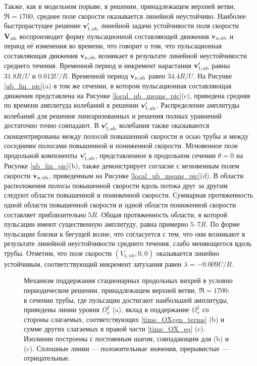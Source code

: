 Также, как в модельном порыве, в решении, принадлежащем верхней ветви, $\Re = 1700$, среднее поле скорости оказывается линейной неустойчиво. Наиболее быстрорастущее решение $\mathbf{v}'_\mathrm{1,ub}$ линейной задачи устойчивости поля скорости $\mathbf{V}_\mathrm{ub}$ воспроизводит форму пульсационной составляющей движения $\mathbf{v}_\mathrm{n,ub}$ и период её изменения во времени, что говорит о том, что пульсационная составляющая движения $\mathbf{v}_\mathrm{n,ub}$ возникает в результате линейной неустойчивости среднего течения. Временной период и инкремент нарастания $\mathbf{v}'_\mathrm{1,ub}$ равны $31.8R/U$ и $0.012U/R$. Временной период $\mathbf{v}_\mathrm{n,ub}$ равен $34.4R/U$. На Рисунке \ref{ub_lin_pic}(a) в том же сечении, в котором пульсационная составляющая движения представлена на Рисунке \ref{local_ub_means_pic}(c), приведена средняя по времени амплитуда колебаний в решении $\mathbf{v}'_\mathrm{1,ub}$. Распределение амплитуды колебаний для решения линеаризованных и решения полных уравнений достаточно точно совпадают. В $\mathbf{v}'_\mathrm{1,ub}$ колебания также оказываются сконцентрированы между полосой повышенной скорости и осью трубы и между соседними полосами повышенной и пониженной скорости. Мгновенное поле продольной компоненты $\mathbf{v}'_\mathrm{1,ub}$, представленное в продольном сечении $\theta = 0$ на Рисунке \ref{ub_lin_pic}(b), также демонстрирует согласие с мгновенным полем скорости $\mathbf{v}_\mathrm{n,ub}$, приведенным на Рисунке \ref{local_ub_means_pic}(d). В области расположения полосы повышенной скорости вдоль потока друг за другим следуют области повышенной и пониженной скорости. Суммарная протяженность одной области повышенной скорости и одной области пониженной скорости составляет приблизительно $5R$. Общая протяженность области, в которой пульсации имеют существенную амплитуду, равна примерно $5$--$7R$. По форме пульсации близки к бегущей волне, что согласуется с тем, что они возникают в результате линейной неустойчивости среднего течения, слабо меняющегося вдоль трубы. Отметим, что поле скорости $(V_\mathrm{x,ub}, 0, 0)$ оказывается линейно устойчивым, соответствующий инкремент затухания равен $\lambda = -0.009U/R$. 


\begin{figure}
\caption{Механизм поддержания стационарных продольных вихрей в условно периодическом решении, принадлежащем верхней ветви, $\Re = 1700$: в сечении трубы, где пульсации достигают наибольшей амплитуды, приведены линии уровня $\Omega_x^2$ (a), вклад в поддержание $\Omega_x^2$ со стороны слагаемых, соответствующих \eqref{time_OXgen_terms} (b) и сумме других слагаемых в правой части \eqref{time_OX_eq} (c). Изолинии построены с постоянным шагом, совпадающим для (b) и (c). Сплошные линии --- положительные значения, прерывистые --- отрицательные.}
\label{ub_OXgen_pic}
\end{figure}


